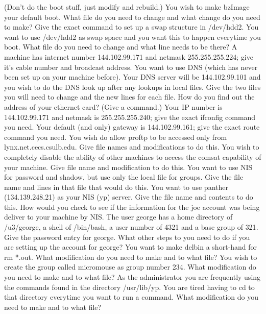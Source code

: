 (Don't do the boot stuff, just modify and rebuild.)
\vskip 1.5in
You wish to make {\ltt{}bzImage} your default boot.
What file do you need to change and what change do you need to make?
\vskip 0.8in
\vfill\eject
\ques
Give the exact command to set up a swap structure in {\ltt{}/dev/hdd2}.
\vskip 0.4in
You want to use {\ltt{}/dev/hdd2} as swap space and you want this to
happen everytime you boot.
What file do you need to change and what line needs to be there?
\vskip 0.6in
\ques
A machine has internet number {\ltt{}144.102.99.171} and
netmask {\ltt{}255.255.255.224}; give it's cable number and broadcast address.
\vskip 1.0in
You want to use DNS (which has never been set up on your machine before).
Your DNS server will be {\ltt{}144.102.99.101} and you wish to do the DNS
look up after any lookups in local files.
Give the two files you will need to change and the new lines for each file.
\vskip 0.8in
How do you find out the address of your ethernet card?
(Give a command.)
\vskip 0.4in
\ques
Your IP number is {\ltt{}144.102.99.171} and netmask is {\ltt{}255.255.255.240};
give the exact {\ltt{}ifconfig} command you need.
\vskip 0.4in
Your default (and only) gateway is {\ltt{}144.102.99.161};
give the exact {\ltt{}route} command you need.
\vskip 0.4in
You wish do allow {\ltt{}proftp} to be accessed only from
{\ltt{}lynx.net.cecs.csulb.edu}.
Give file names and modifications to do this.
\vskip 1.4in
You wish to completely disable the ability of other machines to 
access the {\ltt{}comsat} capability of your machine.
Give file name and modification to do this.
\vskip 0.8in
\vfill\eject
\ques
You want to use NIS for password and shadow, but use only the
local file for groups.
Give the file name and lines in that file that would do this.
\vskip 0.6in
You want to use {\ltt{}panther} ({\ltt{}134.139.248.21}) as your
NIS (yp) server.
Give the file name and contents to do this.
\vskip 0.6in
How would you check to see if the information for the {\ltt{}joe} account
was being deliver to your machine by NIS.
\vskip 0.4in
\ques
The user {\ltt{}george} has  a home directory of {\ltt{}/u3/george},
a shell of {\ltt{}/bin/bash}, a user number of {\ltt{}4321}
and a base group of {\ltt{}321}.
Give the password entry for {\ltt{}george}.
\vskip 0.4in
What other steps to you need to do if you are setting up the
account for {\ltt{}george}?
\vskip 1.2in
\ques
You want to make {\ltt{}delbin} a short-hand for {\ltt{}rm *.out}.
What modification do you need to make and to what file?
\vskip 0.9in
You wish to create the group called {\ltt{}micromouse} as group
number {\ltt{}234}.
What modification do you need to make and to what file?
\vskip 0.9in
As the administrator you are frequently using the commands found
in the directory {\ltt{}/usr/lib/yp}.
You are tired having to {\ltt{}cd} to that directory everytime
you want to run a command.
What modification do you need to make and to what file?
\vskip 1.0in
\bye

